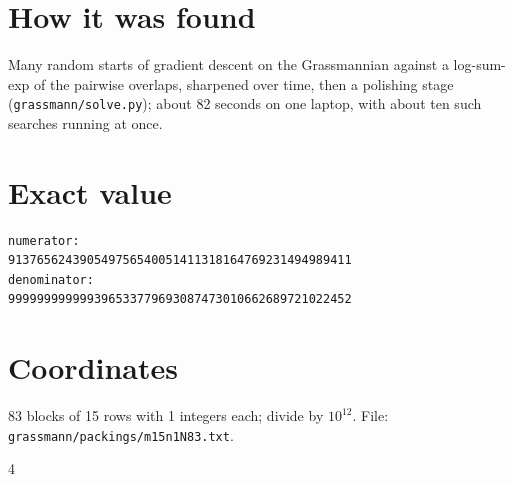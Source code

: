 \documentclass[11pt,a4paper]{article}
\begin{document}
\section{How it was found}
Many random starts of gradient descent on the Grassmannian against a log-sum-exp of the pairwise overlaps, sharpened over time, then a polishing stage (\texttt{grassmann/solve.py}); about 82 seconds on one laptop, with about ten such searches running at once.


\appendix
\section{Exact value}
{\small
\begin{verbatim}
numerator:
913765624390549756540051411318164769231494989411
denominator:
999999999999396533779693087473010662689721022452
\end{verbatim}}

\section{Coordinates}
83 blocks of 15 rows with 1 integers each; divide by $10^{12}$. File: \texttt{grassmann/packings/m15n1N83.txt}.
{\tiny
\begin{multicols}{4}
\end{multicols}}
\end{document}

